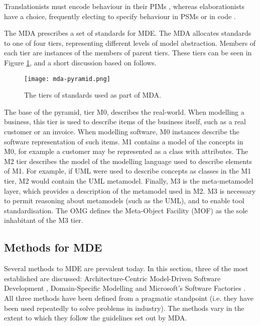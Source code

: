 Translationists must encode behaviour in their PIMs \cite{mellor02executable}, whereas elaborationists have a choice, frequently electing to specify behaviour in PSMs or in code \cite{kleppe03mda}.

The MDA prescribes a set of standards for MDE. The MDA allocates standards to one of four tiers, representing different levels of model abstraction. Members of each tier are instances of the members of parent tiers. These tiers can be seen in Figure \ref{fig:mda-pyramid}, and a short discussion based on \cite[Section 8.2]{kleppe03mda} follows.

\begin{figure}[htbp]
  \begin{center}
    \leavevmode
    \texttt{[image: mda-pyramid.png]}
  \end{center}
  \caption{The tiers of standards used as part of MDA.}
  \label{fig:mda-pyramid}
\end{figure}

The base of the pyramid, tier M0, describes the real-world. When modelling a business, this tier is used to describe items of the business itself, such as a real customer or an invoice. When modelling software, M0 instances describe the software representation of such items. M1 contains a model of the concepts in M0, for example a customer may be represented as a class with attributes. The M2 tier describes the model of the modelling language used to describe elements of M1. For example, if UML \cite{uml212} were used to describe concepts as classes in the M1 tier, M2 would contain the UML metamodel. Finally, M3 is the meta-metamodel layer, which provides a description of the metamodel used in M2. M3 is necessary to permit reasoning about metamodels (such as the UML), and to enable tool standardisation. The OMG defines the Meta-Object Facility (MOF) \cite{mof} as the sole inhabitant of the M3 tier.


\subsection{Methods for MDE}
Several methods to MDE are prevalent today. In this section, three of the most established are discussed: Architecture-Centric Model-Driven Software Development \cite{stahl06mdsd}, Domain-Specific Modelling \cite{kelly08dsm} and Microsoft's Software Factories \cite{greenfield04software}. All three methods have been defined from a pragmatic standpoint (i.e. they have been used repeatedly to solve problems in industry). The methods vary in the extent to which they follow the guidelines set out by MDA.

